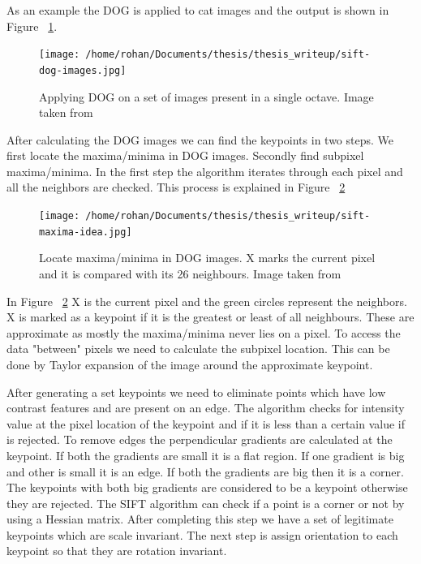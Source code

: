 \documentclass[12pt]{dalcsthesis}
\begin{document}
As an example the DOG is applied to cat images and the output is shown in Figure ~\ref{fig- sift dog images}. 
\begin{figure}
  \centering
     {\texttt{[image: /home/rohan/Documents/thesis/thesis\_writeup/sift-dog-images.jpg]}}
  \caption{\label{fig- sift dog images} Applying DOG on a set of images present in a single octave. Image taken from \cite{sift_url}}
\end{figure}

After calculating the DOG images we can find the keypoints in two steps. We first locate the maxima/minima in DOG images. Secondly find subpixel maxima/minima. In the first step the algorithm iterates through each pixel and all the neighbors are checked. This process is explained in Figure ~\ref{fig- maxima and minima sift octaves}

\begin{figure}
  \centering
     {\texttt{[image: /home/rohan/Documents/thesis/thesis\_writeup/sift-maxima-idea.jpg]}}
  \caption{\label{fig- maxima and minima sift octaves} Locate maxima/minima in DOG images. X marks the current pixel and it is compared with its 26 neighbours. Image taken from \cite{sift_url}}
\end{figure}

In Figure ~\ref{fig- maxima and minima sift octaves} X is the current pixel and the green circles represent the neighbors. X is marked as a keypoint if it is the greatest or least of all neighbours. These are approximate as mostly the maxima/minima never lies on a pixel. To access the data "between" pixels we need to calculate the subpixel location. This can be done by Taylor expansion of the image around the approximate keypoint.

After generating a set keypoints we need to eliminate points which have low contrast features and are present on an edge. The algorithm checks for intensity value at the pixel location of the keypoint and if it is less than a certain value if is rejected. To remove edges the perpendicular gradients are calculated at the keypoint. If both the gradients are small it is a flat region. If one gradient is big and other is small it is an edge. If both the gradients are big then it is a corner. The keypoints with both big gradients are considered to be a keypoint otherwise they are rejected. The SIFT algorithm can check if a point is a corner or not by using a Hessian matrix. After completing this step we have a set of legitimate keypoints which are scale invariant. The next step is assign orientation to each keypoint so that they are rotation invariant.
\end{document}

